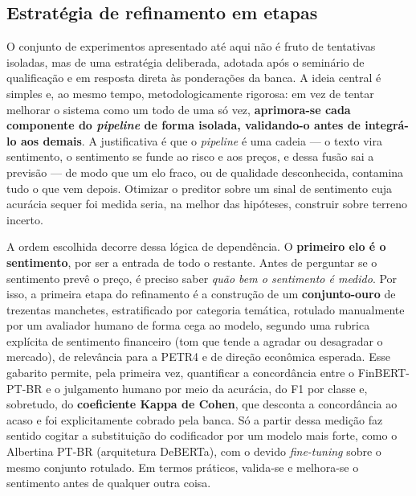 \subsection{Estratégia de refinamento em etapas}
\label{sec:estrategia_refinamento}

O conjunto de experimentos apresentado até aqui não é fruto de tentativas isoladas, mas de uma
estratégia deliberada, adotada após o seminário de qualificação e em resposta direta às ponderações
da banca. A ideia central é simples e, ao mesmo tempo, metodologicamente rigorosa: em vez de tentar
melhorar o sistema como um todo de uma só vez, \textbf{aprimora-se cada componente do \textit{pipeline}
de forma isolada, validando-o antes de integrá-lo aos demais}. A justificativa é que o \textit{pipeline}
é uma cadeia --- o texto vira sentimento, o sentimento se funde ao risco e aos preços, e dessa fusão
sai a previsão --- de modo que um elo fraco, ou de qualidade desconhecida, contamina tudo o que vem
depois. Otimizar o preditor sobre um sinal de sentimento cuja acurácia sequer foi medida seria, na
melhor das hipóteses, construir sobre terreno incerto.

A ordem escolhida decorre dessa lógica de dependência. O \textbf{primeiro elo é o sentimento}, por ser
a entrada de todo o restante. Antes de perguntar se o sentimento prevê o preço, é preciso saber
\emph{quão bem o sentimento é medido}. Por isso, a primeira etapa do refinamento é a construção de um
\textbf{conjunto-ouro} de trezentas manchetes, estratificado por categoria temática, rotulado
manualmente por um avaliador humano de forma cega ao modelo, segundo uma rubrica explícita de
sentimento financeiro (tom que tende a agradar ou desagradar o mercado), de relevância para a PETR4 e
de direção econômica esperada. Esse gabarito permite, pela primeira vez, quantificar a concordância
entre o \mbox{FinBERT-PT-BR} e o julgamento humano por meio da acurácia, do F1 por classe e,
sobretudo, do \textbf{coeficiente Kappa de Cohen}, que desconta a concordância ao acaso e foi
explicitamente cobrado pela banca. Só a partir dessa medição faz sentido cogitar a substituição do
codificador por um modelo mais forte, como o Albertina \mbox{PT-BR} (arquitetura DeBERTa), com o
devido \textit{fine-tuning} sobre o mesmo conjunto rotulado. Em termos práticos, valida-se e melhora-se
o sentimento antes de qualquer outra coisa.

